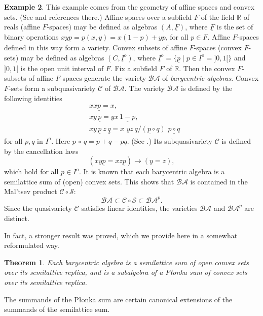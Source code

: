 \documentclass{birkau}
\def\mb{\mathbb}
\newcommand{\mc}{\mathcal}
\newcommand{\mcS}{\mathcal{S}}
\newcommand{\pro}[1]{{#1}^p}
\theoremstyle{plain}
\newtheorem{theorem}{Theorem}[section]
\theoremstyle{definition}
\newtheorem{example}[theorem]{Example}
\numberwithin{equation}{section}
\begin{document}
\begin{example}
  This example comes from the geometry of affine spaces and convex sets. (See \cite{RS02}
  and references there.) Affine spaces over a subfield $F$ of the field $\mb{R}$ of reals
  (affine $F$-spaces) may be defined as algebras $(A, \underline{F})$, where
  $\underline{F}$ is the set of binary operations
  $xy\underline{p} = \underline{p}(x,y) = x(1-p) + yp$, for all $p \in F$. Affine $F$-spaces
  defined in this way form a variety. Convex subsets of affine $F$-spaces (convex
  $F$-sets) may be defined as algebras $(C, \underline{I}^o)$, where
  $\underline{I}^o = \bigl\{\underline{p} \mid p \in I^o = ]0,1[\bigr\}$ and $]0,1[$
  is the open unit interval of $F$. Fix a subfield $F$ of $\mb{R}$. Then the convex
  $F$-subsets of affine $F$-spaces generate the variety $\mc{BA}$ of \emph{barycentric
    algebras}. Convex $F$-sets form a subquasivariety $\mc{C}$ of $\mc{BA}$.  The variety
  $\mc{BA}$ is defined by the following identities
\begin{align*}
& x x \underline{p} = x, \\
& x y\, \underline{p} = y x\, \underline{1-p}, \\
& x y\, \underline{p}\ z\, \underline{q} = x\,\, y z\,
\underline{q/(p\circ q)}\,\, \underline{p\circ q}
\end{align*}
for all $p, q$ in $I^{o}$. Here $p\,
\circ\, q = p+q-pq$.
(See \cite[\S5.8]{RS02}.)
Its subquasivariety $\mc{C}$ is defined by the cancellation laws
\begin{equation}\label{E:cl}
(xy\underline{p} = xz\underline{p}) \rightarrow (y = z),
\end{equation}
which hold for all $p \in I^{o}$.  It is known \cite[\S7.5]{RS02} that each barycentric
algebra is a semilattice sum of (open) convex sets. This shows that $\mc{BA}$ is contained
in the Mal'tsev product $\mc{C} \circ \mcS$:
\begin{equation*}
\mc{BA} \subset \mc{C} \circ \mcS \subset \pro{\mc{BA}}. 
\end{equation*}
Since the quasivariety $\mc{C}$ satisfies linear identities, the varieties $\mc{BA}$ and
$\pro{\mc{BA}}$ are distinct.

In fact, a stronger result was proved, which we provide here in a somewhat reformulated way.

\begin{theorem}\cite[\S 7.5]{RS02}
Each barycentric algebra is a semilattice sum of open convex sets over its semilattice
replica, and is a subalgebra of a P\l onka sum of convex sets over its semilattice
replica.
\end{theorem}
\noindent The summands of the P\l onka sum are certain canonical extensions of the
summands of the semilattice sum.

\end{example}
\end{document}
